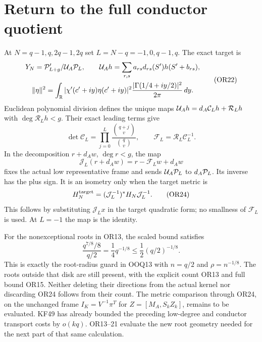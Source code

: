 \documentclass[11pt]{article}
\begin{document}
\section{Return to the full conductor quotient}
At $N=q-1,q,2q-1,2q$ set $L=N-q=-1,0,q-1,q$.
The exact target is
\[
\begin{gathered}
Y_N=\mathcal P'_{L+g}/\mathcal U_A\mathcal P_L,\qquad
\mathcal U_A h=\sum_{r,s}a_{rs}d_{rs}(S')h(S'+b_{rs}),\\
\|\eta\|^2=\int_\mathbb R|\chi'(c'+iy)\eta(c'+iy)|^2
 \frac{|\Gamma(1/4+iy/2)|^2}{2\pi}\,dy .
\end{gathered}
\tag{OR22}
\]
Euclidean polynomial division defines the unique maps
$\mathcal U_A h=d_A\mathcal C_Lh+\mathcal R_Lh$ with
$\deg\mathcal R_Lh<g$. Their exact leading terms give
\[
\det\mathcal C_L=\prod_{j=0}^L
  \frac{\binom{q+j}{v}}{\binom qv},\qquad
\mathcal F_L=\mathcal R_L\mathcal C_L^{-1}.
\]
In the decomposition $r+d_Aw$, $\deg r<g$, the map
\[
\mathcal J_L(r+d_Aw)=r-\mathcal F_Lw+d_Aw
\tag{OR23}
\]
fixes the actual low representative frame and sends
$\mathcal U_A\mathcal P_L$ to $d_A\mathcal P_L$. Its inverse has the plus sign.
It is an isometry only when the target metric is
\[
H_N^{\rm target}=(\mathcal J_L^{-1})^*H_N\mathcal J_L^{-1}.
\tag{OR24}
\]
This follows by substituting $\mathcal J_Lx$ in the target
quadratic form; no smallness of $\mathcal F_L$ is used.
At $L=-1$ the map is the identity.

For the nonexceptional roots in OR13, the scaled bound satisfies
\[
\frac{q^{7/8}/8}{q/2}=\frac14q^{-1/8}
\le \frac12(q/2)^{-1/8}.
\tag{OR25}
\]
This is exactly the root-radius guard in OOQ13 with $n=q/2$
and $\rho=n^{-1/8}$. The roots outside that disk are still
present, with the explicit count OR13 and full bound OR15.
Neither deleting their directions from the actual kernel nor
discarding OR24 follows from their count. The metric comparison
through OR24, on the unchanged frame
$I_K=V^{-1}\pi^T$ for $Z=[M_A,S_kZ_k]$, remains to be evaluated.
KF49 has already bounded the preceding low-degree and conductor
transport costs by $o(kq)$. OR13--21 evaluate the new root
geometry needed for the next part of that same calculation.
\end{document}
